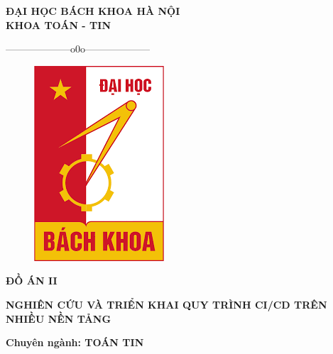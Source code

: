 \documentclass[14pt,oneside,A4paper,openright]{report}
\theoremstyle{plain}
\renewcommand{\Large}{\fontsize{16pt}{16pt}\selectfont}
\begin{document}
\setcounter{page}{1}%

\begin{center}
\Large
{\bf ĐẠI HỌC BÁCH KHOA HÀ NỘI}\\
{\bf KHOA TOÁN - TIN}
\centerline{--------------------o0o--------------------}  
\end{center}
\vspace{0.3cm}
\begin{figure}[ht]
\begin{center}
\includegraphics[scale=0.6]{dhbkhn.png}\\
\end{center}
\end{figure}
\begin{center}
\fontsize{21pt}{17pt}\selectfont
\vspace{0.35cm}
\textbf{ĐỒ ÁN II}\\
\end{center}

\vspace{0.3cm}
\begin{center}
\fontsize{17pt}{16pt}\selectfont

\bf NGHIÊN CỨU VÀ TRIỂN KHAI QUY TRÌNH CI/CD TRÊN NHIỀU NỀN TẢNG

\end{center}
\vspace{0.3cm}
 \begin{center}
	\fontsize{15pt}{16pt}\selectfont 	
	{\bf Chuyên ngành: TOÁN TIN}\\	
\end{center}
\end{document}
